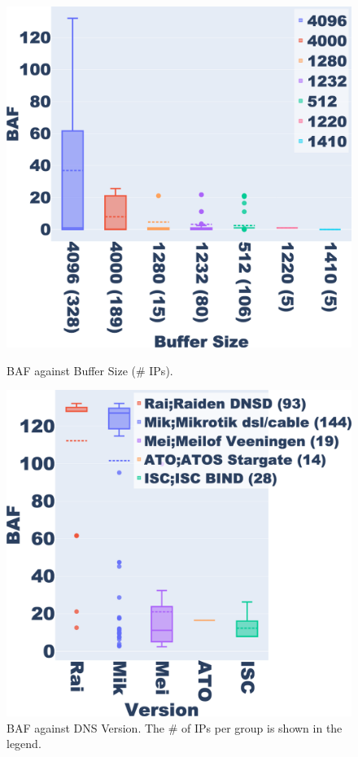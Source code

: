 \captionsetup{font=small}
\begin{figure}[t]
    \centering
    \begin{minipage}[b]{0.2385\textwidth}
        \centering
        \includegraphics[width=1\textwidth]{research paper/plots/SL_boxplot_all_trim.png}
        \caption{BAF against Buffer Size (\# IPs).}
        \label{fig:boxplot_buffersize}
    \end{minipage}
    \hfill
    \begin{minipage}[b]{0.2385\textwidth}
        \centering
        \includegraphics[width=1\textwidth]{research paper/plots/SL_boxplot_restricted_trim.png}
        \caption{BAF against DNS Version. The \# of IPs per group is shown in the legend.}
        \label{fig:fingerprint_boxplot}
    \end{minipage}
\end{figure}


